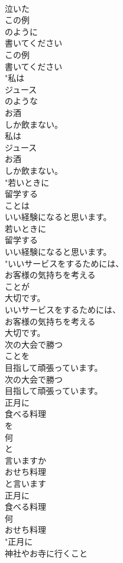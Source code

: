 \documentclass[8pt]{extreport}
\begin{document}
\begin{CJK}{UTF8}{min}
\\	泣いた
\\	この例
\\	のように
\\	書いてください
\\	この例
\\	書いてください
\\	"私は
\\	ジュース
\\	のような
\\	お酒
\\	しか飲まない。
\\	私は
\\	ジュース
\\	お酒
\\	しか飲まない。
\\	"若いときに
\\	留学する
\\	ことは
\\	いい経験になると思います。
\\	若いときに
\\	留学する
\\	いい経験になると思います。
\\	"いいサービスをするためには、
\\	お客様の気持ちを考える
\\	ことが
\\	大切です。
\\	いいサービスをするためには、
\\	お客様の気持ちを考える
\\	大切です。
\\	次の大会で勝つ
\\	ことを
\\	目指して頑張っています。
\\	次の大会で勝つ
\\	目指して頑張っています。
\\	正月に
\\	食べる料理
\\	を
\\	何
\\	と
\\	言いますか
\\	おせち料理
\\	と言います
\\	正月に
\\	食べる料理
\\	何
\\	おせち料理
\\	"正月に
\\	神社やお寺に行くこと

\end{CJK}
\end{document}
